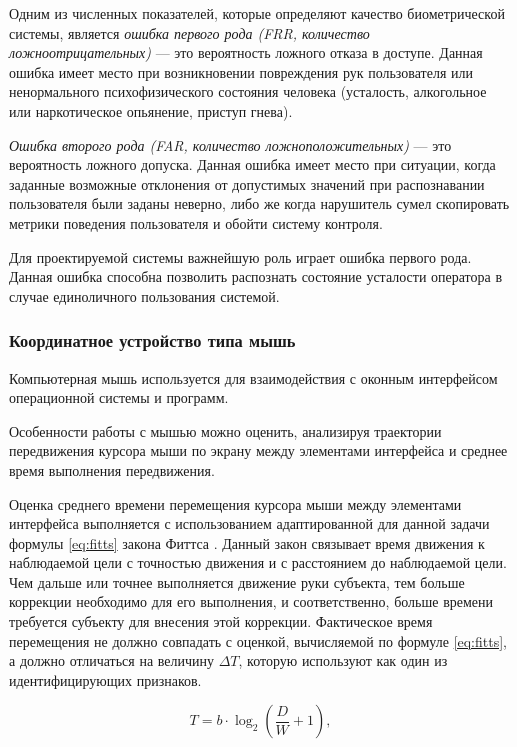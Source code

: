 Одним из численных показателей, которые определяют качество биометрической системы, является \textit{ошибка первого рода (FRR, количество ложноотрицательных)} --- это вероятность ложного отказа в доступе. Данная ошибка имеет место при возникновении повреждения рук пользователя или ненормального психофизического состояния человека (усталость, алкогольное или наркотическое опьянение, приступ гнева).\cite{keystroke}

\textit{Ошибка второго рода (FAR, количество ложноположительных)} --- это вероятность ложного допуска. Данная ошибка имеет место при ситуации, когда заданные возможные отклонения от допустимых значений при распознавании пользователя были заданы неверно, либо же когда нарушитель сумел скопировать метрики поведения пользователя и обойти систему контроля. \cite{keystroke}

Для проектируемой системы важнейшую роль играет ошибка первого рода. Данная ошибка способна позволить распознать состояние усталости оператора в случае единоличного пользования системой.

\subsubsection{Координатное устройство типа мышь}
Компьютерная мышь используется для взаимодействия с оконным интерфейсом операционной системы и программ.

Особенности работы с мышью можно оценить, анализируя траектории передвижения курсора мыши по экрану между элементами интерфейса и среднее время выполнения передвижения. \cite{recognitionOfPsycho}

Оценка среднего времени перемещения курсора мыши между элементами интерфейса выполняется с использованием адаптированной для данной задачи формулы \ref{eq:fitts} закона Фиттса \cite{fitts}. Данный закон связывает время движения к наблюдаемой цели с точностью движения и с расстоянием до наблюдаемой цели. Чем дальше или точнее выполняется движение руки субъекта, тем больше коррекции необходимо для его выполнения, и соответственно, больше времени требуется субъекту для внесения этой коррекции. Фактическое время перемещения не должно совпадать с оценкой, вычисляемой по формуле \ref{eq:fitts}, а должно отличаться на величину $\Delta T$, которую используют как один из идентифицирующих признаков. \cite{mouseMethod}

\begin{equation}
\label{eq:fitts}
T = b \cdot \log_{2}\left(\frac{D}{W} + 1\right),
\end{equation}

